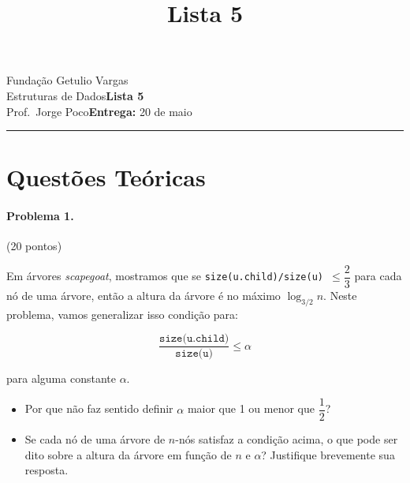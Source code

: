 \documentclass{article}
\title{Lista 5}
\date{}
\newcommand{\assignment}{Lista 5}
\newcommand{\duedate}{20 de maio}
\begin{document}
Fundação Getulio Vargas\hfill\\
Estruturas de Dados\hfill\textbf{\assignment}\\
Prof.\ Jorge Poco\hfill\textbf{Entrega:} \duedate\\
\smallskip\hrule\bigskip

{\let\newpage\relax\maketitle}
\maketitle

\section{Questões Teóricas}

\paragraph{Problema 1.} (20 pontos)

Em árvores \textit{scapegoat}, mostramos que se \texttt{size(u.child)/size(u) $\leq \dfrac{2}{3}$} para cada nó de uma árvore, então a altura da árvore é no máximo $\log_{3/2} n$. Neste problema, vamos generalizar isso
condição para:

\begin{equation*}
    \dfrac{\texttt{size(u.child)}}{\texttt{size(u)}} \leq \alpha
\end{equation*}

para alguma constante $\alpha$.

\begin{itemize}
\item Por que não faz sentido definir $\alpha$ maior que 1 ou menor que $\dfrac{1}{2}$?
\item Se cada nó de uma árvore de $n$-nós satisfaz a condição acima, o que pode ser dito sobre a altura da árvore em função de $n$ e $\alpha$? Justifique brevemente sua resposta.
\end{itemize}
\end{document}
